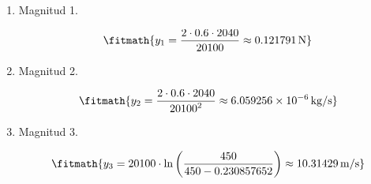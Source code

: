 \begin{enumerate}

\item Magnitud 1.

\[\fitmath{y_{1}=\frac{2\cdot 0.6\cdot 2040}{20100}\approx 0.121791\,\mathrm{N}}\]

\item Magnitud 2.

\[\fitmath{y_{2}=\frac{2\cdot 0.6\cdot 2040}{{20100}^{2}}\approx 6.059256\times10^{-6}\,\mathrm{kg/s}}\]

\item Magnitud 3.

\[\fitmath{y_{3}=20100\cdot \ln\left(\frac{450}{450-0.230857652}\right)\approx 10.31429\,\mathrm{m/s}}\]

\end{enumerate}
